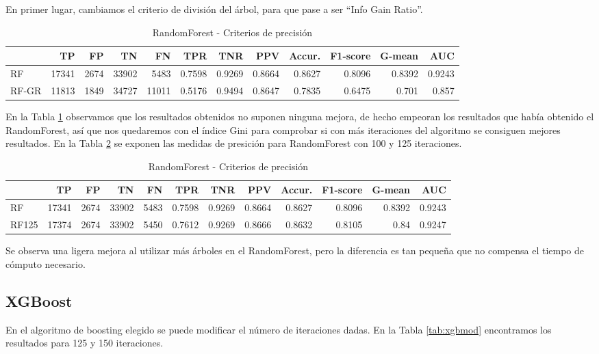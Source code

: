 \documentclass[a4paper, 20pt]{article}
\begin{document}
En primer lugar, cambiamos el criterio de división del árbol, para que pase a ser ``Info Gain Ratio''.

\begin{table}[H]
\centering
\caption{RandomForest - Criterios de precisión}
\label{tab:rfgainratio}
\begin{tabular}{lrrrrrrrrrrr}
\toprule
 & TP & FP & TN & FN & TPR & TNR & PPV & Accur. & F1-score & G-mean & AUC\\ \midrule
RF & 17341 & 2674 & 33902 & 5483 & 0.7598 & 0.9269 & 0.8664 & 0.8627 & 0.8096 & 0.8392 & 0.9243\\
RF-GR & 11813 & 1849 & 34727 & 11011 & 0.5176 & 0.9494 & 0.8647 & 0.7835 & 0.6475 & 0.701 & 0.857\\
\bottomrule
\end{tabular}
\end{table}

En la Tabla \ref{tab:rfgainratio} observamos que los resultados obtenidos no suponen ninguna mejora, de hecho empeoran los resultados que había obtenido el RandomForest, así que nos quedaremos con el índice Gini para comprobar si con más iteraciones del algoritmo se consiguen mejores resultados. En la Tabla \ref{tab:rf125} se exponen las medidas de presición para RandomForest con 100 y 125 iteraciones.

\begin{table}[H]
\centering
\caption{RandomForest - Criterios de precisión}
\label{tab:rf125}
\begin{tabular}{lrrrrrrrrrrr}
\toprule
 & TP & FP & TN & FN & TPR & TNR & PPV & Accur. & F1-score & G-mean & AUC\\ \midrule
RF & 17341 & 2674 & 33902 & 5483 & 0.7598 & 0.9269 & 0.8664 & 0.8627 & 0.8096 & 0.8392 & 0.9243\\
RF125 & 17374 & 2674 & 33902 & 5450 & 0.7612 & 0.9269 & 0.8666 & 0.8632 & 0.8105 & 0.84 & 0.9247\\
\bottomrule
\end{tabular}
\end{table}

Se observa una ligera mejora al utilizar más árboles en el RandomForest, pero la diferencia es tan pequeña que no compensa el tiempo de cómputo necesario.

\subsection{XGBoost}

En el algoritmo de boosting elegido se puede modificar el número de iteraciones dadas. En la Tabla \ref{tab:xgbmod} encontramos los resultados para 125 y 150 iteraciones.
\end{document}
